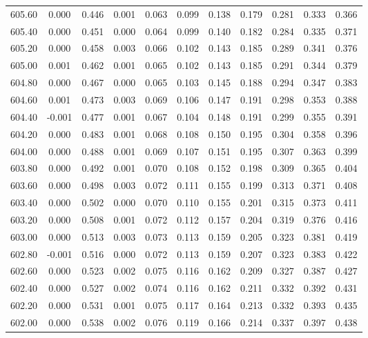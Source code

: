 \begin{longtable}{cccccccccc}
    605.60 &  0.000 &  0.446 &  0.001 &  0.063 &  0.099 &  0.138 &  0.179 &  0.281 &  0.333 &  0.366 \\
    605.40 &  0.000 &  0.451 &  0.000 &  0.064 &  0.099 &  0.140 &  0.182 &  0.284 &  0.335 &  0.371 \\
    605.20 &  0.000 &  0.458 &  0.003 &  0.066 &  0.102 &  0.143 &  0.185 &  0.289 &  0.341 &  0.376 \\
    605.00 &  0.001 &  0.462 &  0.001 &  0.065 &  0.102 &  0.143 &  0.185 &  0.291 &  0.344 &  0.379 \\
    604.80 &  0.000 &  0.467 &  0.000 &  0.065 &  0.103 &  0.145 &  0.188 &  0.294 &  0.347 &  0.383 \\
    604.60 &  0.001 &  0.473 &  0.003 &  0.069 &  0.106 &  0.147 &  0.191 &  0.298 &  0.353 &  0.388 \\
    604.40 & -0.001 &  0.477 &  0.001 &  0.067 &  0.104 &  0.148 &  0.191 &  0.299 &  0.355 &  0.391 \\
    604.20 &  0.000 &  0.483 &  0.001 &  0.068 &  0.108 &  0.150 &  0.195 &  0.304 &  0.358 &  0.396 \\
    604.00 &  0.000 &  0.488 &  0.001 &  0.069 &  0.107 &  0.151 &  0.195 &  0.307 &  0.363 &  0.399 \\
    603.80 &  0.000 &  0.492 &  0.001 &  0.070 &  0.108 &  0.152 &  0.198 &  0.309 &  0.365 &  0.404 \\
    603.60 &  0.000 &  0.498 &  0.003 &  0.072 &  0.111 &  0.155 &  0.199 &  0.313 &  0.371 &  0.408 \\
    603.40 &  0.000 &  0.502 &  0.000 &  0.070 &  0.110 &  0.155 &  0.201 &  0.315 &  0.373 &  0.411 \\
    603.20 &  0.000 &  0.508 &  0.001 &  0.072 &  0.112 &  0.157 &  0.204 &  0.319 &  0.376 &  0.416 \\
    603.00 &  0.000 &  0.513 &  0.003 &  0.073 &  0.113 &  0.159 &  0.205 &  0.323 &  0.381 &  0.419 \\
    602.80 & -0.001 &  0.516 &  0.000 &  0.072 &  0.113 &  0.159 &  0.207 &  0.323 &  0.383 &  0.422 \\
    602.60 &  0.000 &  0.523 &  0.002 &  0.075 &  0.116 &  0.162 &  0.209 &  0.327 &  0.387 &  0.427 \\
    602.40 &  0.000 &  0.527 &  0.002 &  0.074 &  0.116 &  0.162 &  0.211 &  0.332 &  0.392 &  0.431 \\
    602.20 &  0.000 &  0.531 &  0.001 &  0.075 &  0.117 &  0.164 &  0.213 &  0.332 &  0.393 &  0.435 \\
    602.00 &  0.000 &  0.538 &  0.002 &  0.076 &  0.119 &  0.166 &  0.214 &  0.337 &  0.397 &  0.438 \\

\end{longtable}
